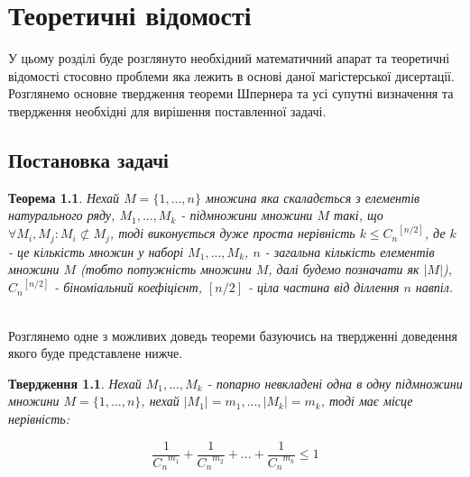 \chapter{Теоретичні відомості}


У цьому розділі буде розглянуто необхідний математичний апарат та теоретичні відомості стосовно проблеми яка лежить в основі даної магістерської дисертації. Розглянемо основне твердження теореми Шпернера та усі супутні визначення та твердження необхідні для вирішення поставленної задачі.


\section{Постановка задачі}
\newtheorem{shperner}{Теорема}
\begin{shperner}
Нехай $ M = \{1,...,n\} $ множина яка скаладється з елементів натурального ряду,
$M_1,...,M_k$ - підмножини множини $ M $ такі, що $ \forall M_i,M_j: M_i \not\subset M_j $, 
тоді виконується дуже проста нерівність $k \leq {C_n}^{[n/2]}$, де $ k $ - це кількість множин у наборі $M_1,...,M_k$, $ n $ - загальна кількість елементів множини $ M $ (тобто потужність множини $ M $, далі будемо позначати як $ |M| $), $ {C_n}^{[n/2]} $ - біноміальний коефіцієнт, $ [n/2] $ - ціла частина від діллення $ n $ навпіл. 
\end{shperner}


\\

Розглянемо одне з можливих доведь теореми базуючись на твердженні доведення якого буде представлене нижче.

\newtheorem{condition1}{Твердження}
\begin{condition1}
Нехай $ M_1,...,M_k $ - попарно невкладені одна в одну підмножини множини $ M = \{1,...,n\} $, нехай $ |M_1| = m_1,...,|M_k| = m_k $, тоді має місце нерівність:
\end{condition1}
\begin{large}
\begin{equation} \label{eq:binomial} 
\frac{1}{{C_n}^{m_1}} + \frac{1}{{C_n}^{m_2}} + ... + \frac{1}{{C_n}^{m_k}} \leq 1
\end{equation}
\end{large}
\newline


